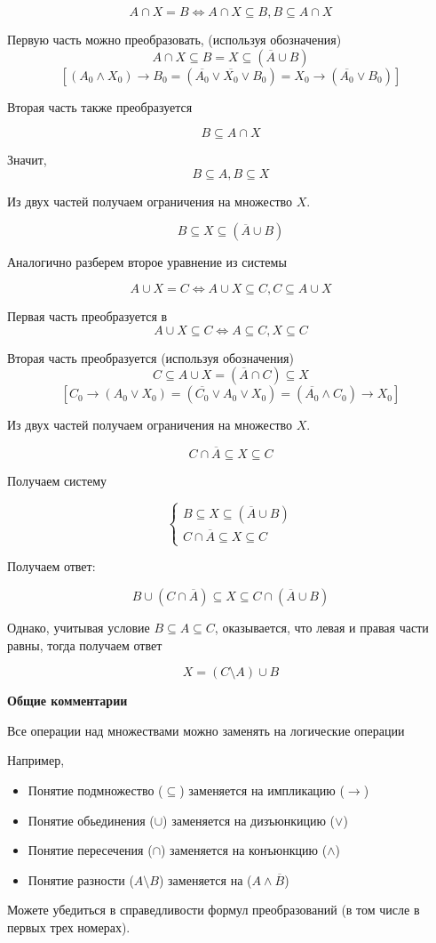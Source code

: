 \documentclass{article}
\begin{document}
$$ A \cap X = B  \iff A \cap X \subseteq B , B \subseteq A \cap X$$

Первую часть можно преобразовать, (используя обозначения) 
$$A \cap X \subseteq B = X \subseteq (\overline{A} \cup B)$$
$$[(A_0 \wedge X_0) \rightarrow B_0 = (\overline{A_0} \vee \overline{X_0} \vee B_0) = X_0 \rightarrow (\overline{A_0} \vee B_0 ) ]$$

Вторая часть также преобразуется 

$$  B \subseteq A \cap X$$ 

Значит, $$ B \subseteq A , B \subseteq X$$

Из двух частей получаем ограничения на множество $X$.

$$B \subseteq X \subseteq (\overline{A} \cup B)$$ 

Аналогично разберем второе уравнение из системы

$$ A \cup X = C  \iff A \cup X \subseteq C , C \subseteq A \cup X$$

Первая часть преобразуется в 
$$A \cup X \subseteq C \iff A \subseteq C, X \subseteq C$$

Вторая часть преобразуется (используя обозначения)
$$C \subseteq A \cup X = (\overline{A} \cap C) \subseteq X $$
$$[C_0 \rightarrow (A_0 \vee X_0) = (\overline{C_0} \vee A_0 \vee X_0) = (\overline{A_0} \wedge C_0 ) \rightarrow X_0 ]$$

Из двух частей получаем ограничения на множество $X$.

$$C \cap \overline{A} \subseteq X \subseteq C$$ 

Получаем систему 

$$\begin{cases} B \subseteq X \subseteq (\overline{A} \cup B) \\ C \cap \overline{A} \subseteq X \subseteq C \end{cases}$$

Получаем ответ:

$$ B \cup (C \cap \overline{A}) \subseteq X \subseteq C \cap (\overline{A} \cup B)$$

Однако, учитывая условие $B \subseteq A \subseteq C$, оказывается, что левая и правая части равны, тогда получаем ответ

$$X = (C \setminus A) \cup B$$

\textbf{Общие комментарии}

Все операции над множествами можно заменять на логические операции

Например,
\begin{itemize}
    \item Понятие подмножество ($\subseteq$) заменяется на импликацию ($\rightarrow$)
    \item Понятие обьединения ($\cup$) заменяется на дизъюнкицию ($\vee$)
    \item Понятие пересечения ($\cap$) заменяется на конъюнкцию ($\wedge$)
    \item Понятие разности ($A \setminus B$) заменяется на ($A \wedge \overline{B}$)
\end{itemize}

Можете убедиться в справедливости формул преобразований (в том числе в первых трех номерах). 
\end{document}
